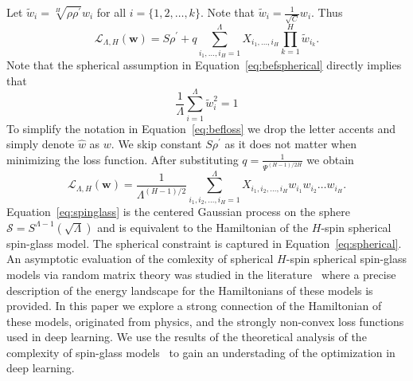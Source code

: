 \documentclass[twoside]{article}
\begin{document}
Let $\tilde{w}_i = \sqrt[H]{\rho\rho^{'}}w_i$ for all $i = \{1,2,\dots,k\}$. Note that $\tilde{w}_i = \frac{1}{\sqrt{C}}w_i$. Thus
\begin{equation}
\mathcal{L}_{\Lambda,H}({\bm w}) = S\rho^{'} + q\sum_{i_1,\dots,i_H=1}^{\Lambda}X_{i_1,\dots,i_H}\prod_{k = 1}^{H}\tilde{w}_{i_k}.
\label{eq:befloss}
\end{equation}
Note that the spherical assumption in Equation~\ref{eq:befspherical} directly implies that
\begin{equation}
\frac{1}{\Lambda}\sum_{i=1}^{\Lambda}\tilde{w}_i^2 = 1
\label{eq:spherical}
\end{equation}
To simplify the notation in Equation~\ref{eq:befloss} we drop the letter accents and simply denote $\hat{w}$ as $w$. We skip constant $S\rho^{'}$ as it does not matter when minimizing the loss function. After substituting $q = \frac{1}{\Psi^{(H-1)/2H}}$ we obtain
\begin{equation}
\mathcal{L}_{\!\Lambda,H}({\bm w}) \!=\! \frac{1}{\Lambda^{\!(H\!-\!1)/2}}\!\!\!\!\!\!\!\sum_{i_1,i_2,\dots,i_H=1}^{\Lambda}\!\!\!\!\!\!\!\!\!\!\!X_{i_1,i_2,\dots,i_H}\!w_{i_1}\!w_{i_2}\!\!\dots\!w_{i_H}.
\label{eq:spinglass}
\end{equation}
Equation~\ref{eq:spinglass} is the centered Gaussian process on the sphere $\mathcal{S} = S^{\Lambda-1}(\sqrt{\Lambda})$ and is equivalent to the Hamiltonian of the $H$-spin spherical spin-glass model. The spherical constraint is captured in Equation~\ref{eq:spherical}. An asymptotic evaluation of the comlexity of spherical $H$-spin spherical spin-glass models via random matrix theory was studied in the literature~\cite{AAC2010} where a precise description of the energy landscape for the Hamiltonians of these models is provided. In this paper we explore a strong connection of the Hamiltonian of these models, originated from physics, and the strongly non-convex loss functions used in deep learning. We use the results of the theoretical analysis of the complexity of spin-glass models~\cite{AAC2010} to gain an understading of the optimization in deep learning. 
\end{document}
